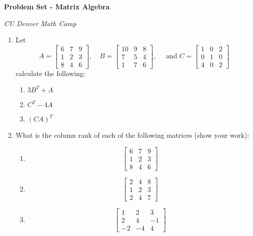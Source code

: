 \documentclass[12pt]{article}
\begin{document}
\begin{center}
  {\Huge\bf Problem Set - Matrix Algebra}
  
  \smallskip
  {\large\it CU Denver Math Camp}
\end{center}


\begin{enumerate}
  \item Let 
  $$
    A = \begin{bmatrix} 6 & 7 & 9 \\ 1 & 2 & 3 \\ 8 & 4 & 6 \end{bmatrix}, 
    \quad 
    B = \begin{bmatrix} 10 & 9 & 8 \\ 7 & 5 & 4 \\ 1 & 7 & 6 \end{bmatrix},
    \quad \text{ and } 
    C = \begin{bmatrix} 1 & 0 & 2 \\ 0 & 1 & 0 \\ 4 & 0 & 2 \end{bmatrix}
  $$ 
  calculate the following:
  
  \begin{enumerate}
    \item $3B^T + A$
    \item $C^T - 4A$
    \item $(CA)^T$
  \end{enumerate}
  
  \bigskip
  \item What is the column rank of each of the following matrices (show your work):
  
  \begin{enumerate}
    \item $$ \begin{bmatrix} 6 & 7 & 9 \\ 1 & 2 & 3 \\ 8 & 4 & 6 \end{bmatrix} $$
    
    \item $$ \begin{bmatrix} 2 & 4 & 8 \\ 1 & 2 & 3 \\ 2 & 4 & 7 \end{bmatrix} $$
    
    \item $$ \begin{bmatrix} 1 & 2 & 3 \\ 2 & 4 & -1 \\ -2 & -4 & 4 \end{bmatrix} $$
  \end{enumerate}
  

\end{enumerate}
\end{document}
